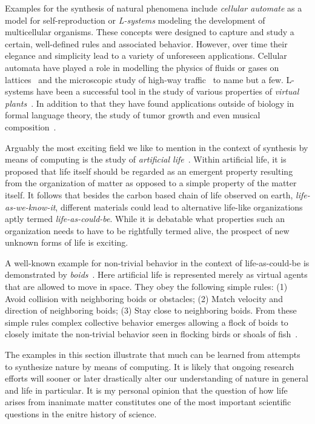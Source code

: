 		Examples for the synthesis of natural phenomena include \emph{cellular automate} as a model for self-reproduction or \emph{L-systems} modeling the development of multicellular organisms. These concepts were designed to capture and study a certain, well-defined rules and associated behavior. However, over time their elegance and simplicity lead to a variety of unforeseen applications. Cellular automata have played a role in modelling the physics of fluids or gases on lattices~\cite{rothman2004lattice} and the microscopic study of high-way traffic~\cite{nagel1998two} to name but a few. L-systems have been a successful tool in the study of various properties of \emph{virtual plants}~\cite{tardieu2003virtual}. In addition to that they have found applications outside of biology in formal language theory, the study of tumor growth and even musical composition~\cite{de2005natural}.

		Arguably the most exciting field we like to mention in the context of synthesis by means of computing is the study of \emph{artificial life}~\cite{Langton:1995:ALO:526815}. Within artificial life, it is proposed that life itself should be regarded as an emergent property resulting from the organization of matter as opposed to a simple property of the matter itself. It follows that besides the carbon based chain of life observed on earth, \ie \emph{life-as-we-know-it}, different materials could lead to alternative life-like organizations aptly termed \emph{life-as-could-be}. While it is debatable what properties such an organization needs to have to be rightfully termed alive, the prospect of new unknown forms of life is exciting. 

		A well-known example for non-trivial behavior in the context of life-as-could-be is demonstrated by \emph{boids}~\cite{Reynolds:1987:FHS:37401.37406}. Here artificial life is represented merely as virtual agents that are allowed to move in space. They obey the following simple rules: (1) Avoid collision with neighboring boids or obstacles; (2) Match velocity and direction of neighboring boids; (3) Stay close to neighboring boids. From these simple rules complex collective behavior emerges allowing a flock of boids to closely imitate the non-trivial behavior seen in flocking birds or shoals of fish~\cite{de2007fundamentals}.

		The examples in this section illustrate that much can be learned from attempts to synthesize nature by means of computing. It is likely that ongoing research efforts will sooner or later drastically alter our understanding of nature in general and life in particular. It is my personal opinion that the question of how life arises from inanimate matter constitutes one of the most important scientific questions in the enitre history of science.

